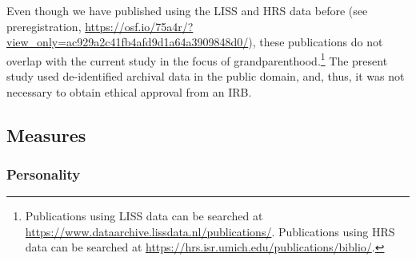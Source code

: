 \documentclass[
  english,
  man, noextraspace]{apa7}
\begin{document}
Even though we have published using the LISS and HRS data before (see preregistration, \url{https://osf.io/75a4r/?view_only=ac929a2c41fb4afd9d1a64a3909848d0/}), these publications do not overlap with the current study in the focus of grandparenthood.\footnote{Publications using LISS data can be searched at \url{https://www.dataarchive.lissdata.nl/publications/}. Publications using HRS data can be searched at \url{https://hrs.isr.umich.edu/publications/biblio/}.} The present study used de-identified archival data in the public domain, and, thus, it was not necessary to obtain ethical approval from an IRB.

\hypertarget{measures}{%
\subsection{Measures}\label{measures}}

\hypertarget{personality}{%
\subsubsection{Personality}\label{personality}}
\end{document}
